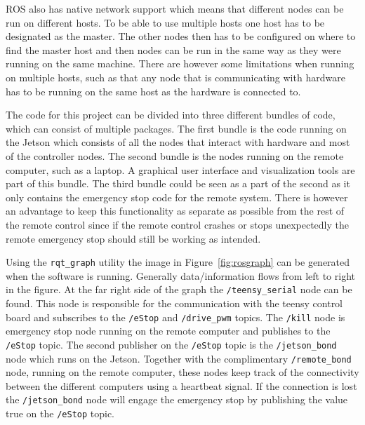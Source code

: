 \documentclass{LTHtwocol} %
\newcommand{\figref}[1]{Figure~\ref{#1}}
\begin{document}
ROS also has native network support which means that different nodes can be run on different hosts. To be able to use multiple hosts one host has to be designated as the master. The other nodes then has to be configured on where to find the master host and then nodes can be run in the same way as they were running on the same machine. There are however some limitations when running on multiple hosts, such as that any node that is communicating with hardware has to be running on the same host as the hardware is connected to.

The code for this project can be divided into three different bundles of code, which can consist of multiple packages. The first bundle is the code running on the Jetson which consists of all the nodes that interact with hardware and most of the controller nodes. The second bundle is the nodes running on the remote computer, such as a laptop. A graphical user interface and visualization tools are part of this bundle. The third bundle could be seen as a part of the second as it only contains the emergency stop code for the remote system. There is however an advantage to keep this functionality as separate as possible from the rest of the remote control since if the remote control crashes or stops unexpectedly the remote emergency stop should still be working as intended.

Using the \texttt{rqt\_graph}\cite{rqt_graph} utility the image in \figref{fig:rosgraph} can be generated when the software is running. Generally data/information flows from left to right in the figure. At the far right side of the graph the \texttt{/teensy\_serial} node can be found. This node is responsible for the communication with the teensy control board and subscribes to the \texttt{/eStop} and \texttt{/drive\_pwm} topics. The \texttt{/kill} node is emergency stop node running on the remote computer and publishes to the \texttt{/eStop} topic. The second publisher on the \texttt{/eStop} topic is the \texttt{/jetson\_bond} node which runs on the Jetson. Together with the complimentary \texttt{/remote\_bond} node, running on the remote computer, these nodes keep track of the connectivity between the different computers using a heartbeat signal. If the connection is lost the \texttt{/jetson\_bond} node will engage the emergency stop by publishing the value true on the \texttt{/eStop} topic.
\end{document}
